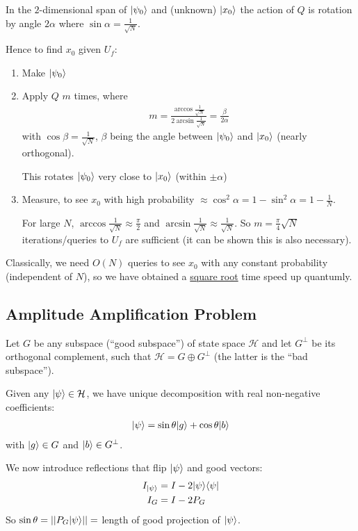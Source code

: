 \documentclass[]{article}
\begin{document}
\begin{theorem*}[Grover 1996]
	In the $2$-dimensional span of $\lvert\psi_0\rangle$ and (unknown) $\lvert x_0\rangle$ the action of $Q$ is rotation by angle $2\alpha$ where $\sin\alpha = \frac{1}{\sqrt{N}}$.
\end{theorem*}
Hence to find $x_0$ given $U_f$:
\begin{enumerate}
	\item Make $\lvert\psi_0\rangle$
	\item Apply $Q$ $m$ times, where
	\begin{align*}
		m = \frac{\arccos \frac{1}{\sqrt{N}}}{2\arcsin\frac{1}{\sqrt{N}}} = \frac{\beta}{2\alpha}
	\end{align*}
	with $\cos\beta = \frac{1}{\sqrt{N}}$, $\beta$ being the angle between $\lvert\psi_0\rangle$ and $\lvert x_0\rangle$ (nearly orthogonal).

	This rotates $\lvert\psi_0\rangle$ very close to $\lvert x_0\rangle$ (within $\pm \alpha$)

	\item Measure, to see $x_0$ with high probability $\approx \cos^2\alpha  = 1 - \sin^2\alpha = 1 - \frac{1}{N}$.
	
	For large $N$, $\arccos\frac{1}{\sqrt{N}} \approx \frac{\pi}{2}$ and $\arcsin\frac{1}{\sqrt{N}} \approx \frac{1}{\sqrt{N}}$. So $m = \frac{\pi}{4}\sqrt{N}$ iterations/queries to $U_f$ are sufficient (it can be shown this is also necessary).
\end{enumerate}

Classically, we need $O(N)$ queries to see $x_0$ with any constant probability (independent of $N$), so we have obtained a \underline{square root} time speed up quantumly.

\subsection*{Amplitude Amplification Problem}

Let $G$ be any subspace (``good subspace'') of state space $\mathcal{H}$ and let $G^{\perp}$ be its orthogonal complement, such that $\mathcal{H} = G \oplus G^\perp$ (the latter is the ``bad subspace'').

Given any $\lvert\psi\rangle\in \mathcal{H}$, we have unique decomposition with real non-negative coefficients:
\begin{align*}
	\lvert\psi\rangle = \sin\theta \lvert g\rangle + \cos\theta\lvert b\rangle
\end{align*}
with $\lvert g\rangle \in G$ and $\lvert b\rangle\in G^\perp$.

We now introduce reflections that flip $\lvert\psi\rangle$ and good vectors:
\begin{align*}
	I_{\lvert\psi\rangle} &= I - 2\lvert\psi\rangle\langle\psi\rvert\\
	I_G &= I - 2P_G
\end{align*}
So $\sin \theta = ||P_G\lvert\psi\rangle|| = $ length of good projection of $\lvert\psi\rangle$.
\end{document}
